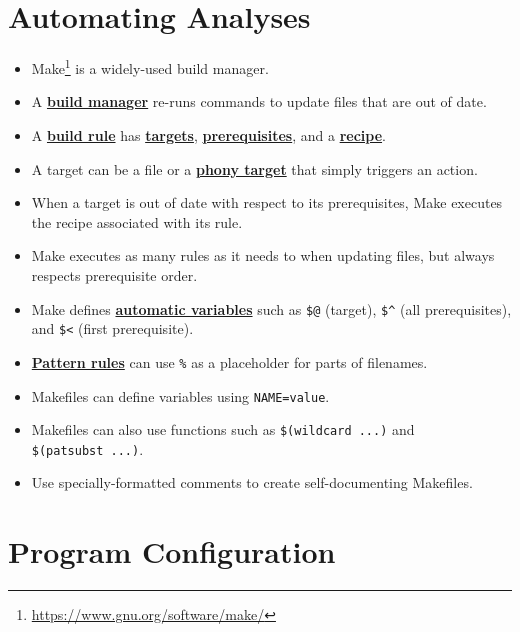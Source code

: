 \documentclass[
]{krantz}
\providecommand{\tightlist}{%
  \setlength{\itemsep}{0pt}\setlength{\parskip}{0pt}}
\renewcommand{\href}[2]{#2\footnote{\url{#1}}}
\newcommand{\gref}[2]{\hyperlink{#2}{\textbf{#1}}}
\begin{document}
\hypertarget{automating-analyses-1}{%
\section{Automating Analyses}\label{automating-analyses-1}}

\begin{itemize}
\tightlist
\item
  \href{https://www.gnu.org/software/make/}{Make} is a widely-used build manager.
\item
  A \gref{build manager}{build\_manager} re-runs commands to update files that are out of date.
\item
  A \gref{build rule}{build\_rule} has \gref{targets}{build\_target}, \gref{prerequisites}{prerequisite}, and a \gref{recipe}{build\_recipe}.
\item
  A target can be a file or a \gref{phony target}{phony\_target} that simply triggers an action.
\item
  When a target is out of date with respect to its prerequisites, Make executes the recipe associated with its rule.
\item
  Make executes as many rules as it needs to when updating files, but always respects prerequisite order.
\item
  Make defines \gref{automatic variables}{automatic\_variable} such as \texttt{\$@} (target), \texttt{\$\^{}} (all prerequisites), and \texttt{\$\textless{}} (first prerequisite).
\item
  \gref{Pattern rules}{pattern\_rule} can use \texttt{\%} as a placeholder for parts of filenames.
\item
  Makefiles can define variables using \texttt{NAME=value}.
\item
  Makefiles can also use functions such as \texttt{\$(wildcard\ ...)} and \texttt{\$(patsubst\ ...)}.
\item
  Use specially-formatted comments to create self-documenting Makefiles.
\end{itemize}

\hypertarget{program-configuration-1}{%
\section{Program Configuration}\label{program-configuration-1}}
\end{document}
